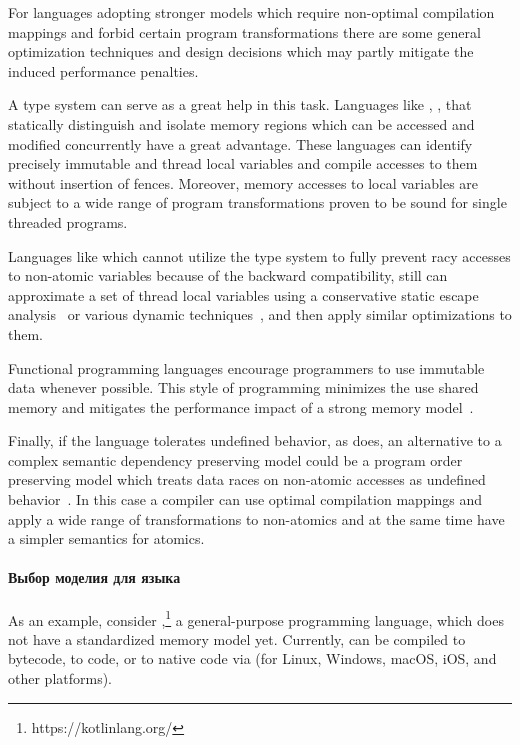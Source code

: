For languages adopting stronger models which require non-optimal
compilation mappings and forbid certain program transformations
there are some general optimization techniques and design decisions
which may partly mitigate the induced performance penalties.

A type system can serve as a great help in this task. 
Languages like \Haskell, \OCaml, \Rust that 
statically distinguish and isolate memory regions 
which can be accessed and modified concurrently have a great advantage.
These languages can identify precisely 
immutable and thread local variables
and compile accesses to them without insertion of fences.
Moreover, memory accesses to local variables are subject to 
a wide range of program transformations proven to be
sound for single threaded programs. 
 
Languages like \Java which cannot utilize the type system 
to fully prevent racy accesses to non-atomic variables 
because of the backward compatibility, still can 
approximate a set of thread local variables    
using a conservative static escape analysis~\cite{Choi-al:OOPSLA1999}
or various dynamic techniques~\cite{Liu-al:PLDI19},
and then apply similar optimizations to them. 

Functional programming languages encourage 
programmers to use immutable data whenever possible.
This style of programming minimizes the use 
shared memory and mitigates the performance impact 
of a strong memory model~\cite{Vollmer-al:PPoPP17}. 

Finally, if the language tolerates undefined behavior, as \CPP does, 
an alternative to a complex semantic dependency preserving model
could be a program order preserving model 
which treats data races on non-atomic accesses as 
undefined behavior~\cite{Boehm-Demsky:MSPC14, Ou-Demsky:OOPSLA18}.
In this case a compiler can use optimal compilation mappings 
and apply a wide range of transformations to non-atomics 
and at the same time have a simpler semantics for atomics.

\paragraph{Выбор моделия для языка \Kotlin}
As an example, %
consider \Kotlin,\footnote{https://kotlinlang.org/}
a general-purpose programming language,
which does not have a standardized memory model yet.
Currently, \Kotlin can be compiled 
to \Java bytecode, to \JS code, or to native code via \LLVM
(for Linux, Windows, macOS, iOS, and other platforms).


